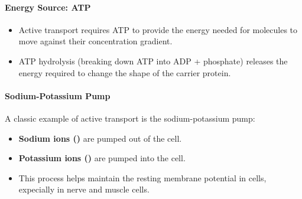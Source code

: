 \paragraph{Energy Source: ATP}
\begin{itemize}
    \item Active transport requires ATP to provide the energy needed for molecules to move against their concentration gradient.
    \item ATP hydrolysis (breaking down ATP into ADP + phosphate) releases the energy required to change the shape of the carrier
    protein.
\end{itemize}

\paragraph{Sodium-Potassium Pump}
A classic example of active transport is the sodium-potassium pump:
\begin{itemize}
    \item \textbf{Sodium ions ()} are pumped out of the cell.
    \item \textbf{Potassium ions ()} are pumped into the cell.
    \item This process helps maintain the resting membrane potential in cells, expecially in nerve and muscle cells.
\end{itemize}

